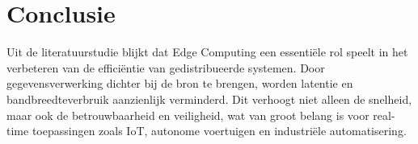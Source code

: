 




    \section{Conclusie}

    Uit de literatuurstudie blijkt dat Edge Computing een essentiële rol speelt in het verbeteren van de efficiëntie van gedistribueerde systemen. Door gegevensverwerking dichter bij de bron te brengen, worden latentie en bandbreedteverbruik aanzienlijk verminderd. Dit verhoogt niet alleen de snelheid, maar ook de betrouwbaarheid en veiligheid, wat van groot belang is voor real-time toepassingen zoals IoT, autonome voertuigen en industriële automatisering.

